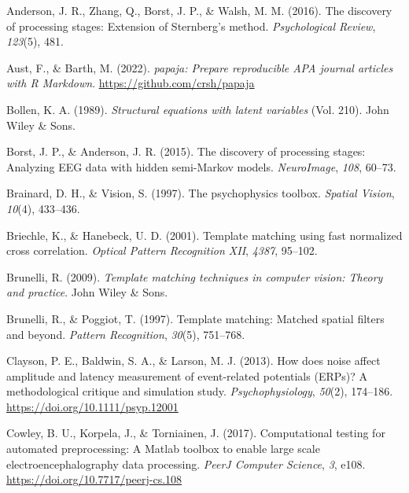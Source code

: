 \documentclass[
  man]{apa7}
\newlength{\cslhangindent}
\newlength{\cslentryspacingunit} %
\newenvironment{CSLReferences}[2] %
 {%
  \setlength{\parindent}{0pt}
  \ifodd #1
  \let\oldpar\par
  \def\par{\hangindent=\cslhangindent\oldpar}
  \fi
  \setlength{\parskip}{#2\cslentryspacingunit}
 }%
 {}
\begin{document}
\hypertarget{refs}{}
\begin{CSLReferences}{1}{0}
\leavevmode{}%
Anderson, J. R., Zhang, Q., Borst, J. P., \& Walsh, M. M. (2016). The discovery of processing stages: {Extension} of {Sternberg}'s method. \emph{Psychological Review}, \emph{123}(5), 481.

\leavevmode{}%
Aust, F., \& Barth, M. (2022). \emph{{papaja}: {Prepare} reproducible {APA} journal articles with {R Markdown}}. \url{https://github.com/crsh/papaja}

\leavevmode{}%
Bollen, K. A. (1989). \emph{Structural equations with latent variables} (Vol. 210). John Wiley \& Sons.

\leavevmode{}%
Borst, J. P., \& Anderson, J. R. (2015). The discovery of processing stages: {Analyzing} {EEG} data with hidden semi-{Markov} models. \emph{NeuroImage}, \emph{108}, 60--73.

\leavevmode{}%
Brainard, D. H., \& Vision, S. (1997). The psychophysics toolbox. \emph{Spatial Vision}, \emph{10}(4), 433--436.

\leavevmode{}%
Briechle, K., \& Hanebeck, U. D. (2001). Template matching using fast normalized cross correlation. \emph{Optical Pattern Recognition {XII}}, \emph{4387}, 95--102.

\leavevmode{}%
Brunelli, R. (2009). \emph{Template matching techniques in computer vision: Theory and practice}. John Wiley \& Sons.

\leavevmode{}%
Brunelli, R., \& Poggiot, T. (1997). Template matching: {Matched} spatial filters and beyond. \emph{Pattern Recognition}, \emph{30}(5), 751--768.

\leavevmode{}%
Clayson, P. E., Baldwin, S. A., \& Larson, M. J. (2013). How does noise affect amplitude and latency measurement of event-related potentials ({ERPs})? {A} methodological critique and simulation study. \emph{Psychophysiology}, \emph{50}(2), 174--186. \url{https://doi.org/10.1111/psyp.12001}

\leavevmode{}%
Cowley, B. U., Korpela, J., \& Torniainen, J. (2017). Computational testing for automated preprocessing: A {Matlab} toolbox to enable large scale electroencephalography data processing. \emph{PeerJ Computer Science}, \emph{3}, e108. \url{https://doi.org/10.7717/peerj-cs.108}


\end{CSLReferences}
\end{document}
